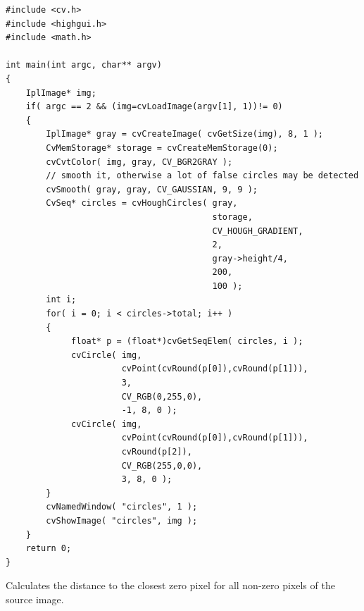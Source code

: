 \begin{lstlisting}
#include <cv.h>
#include <highgui.h>
#include <math.h>

int main(int argc, char** argv)
{
    IplImage* img;
    if( argc == 2 && (img=cvLoadImage(argv[1], 1))!= 0)
    {
        IplImage* gray = cvCreateImage( cvGetSize(img), 8, 1 );
        CvMemStorage* storage = cvCreateMemStorage(0);
        cvCvtColor( img, gray, CV_BGR2GRAY );
        // smooth it, otherwise a lot of false circles may be detected
        cvSmooth( gray, gray, CV_GAUSSIAN, 9, 9 );
        CvSeq* circles = cvHoughCircles( gray,
                                         storage,
                                         CV_HOUGH_GRADIENT,
                                         2,
                                         gray->height/4,
                                         200,
                                         100 );
        int i;
        for( i = 0; i < circles->total; i++ )
        {
             float* p = (float*)cvGetSeqElem( circles, i );
             cvCircle( img,
                       cvPoint(cvRound(p[0]),cvRound(p[1])),
                       3,
                       CV_RGB(0,255,0),
                       -1, 8, 0 );
             cvCircle( img,
                       cvPoint(cvRound(p[0]),cvRound(p[1])),
                       cvRound(p[2]),
                       CV_RGB(255,0,0),
                       3, 8, 0 );
        }
        cvNamedWindow( "circles", 1 );
        cvShowImage( "circles", img );
    }
    return 0;
}
\end{lstlisting}

\label{DistTransform}

Calculates the distance to the closest zero pixel for all non-zero pixels of the source image.


